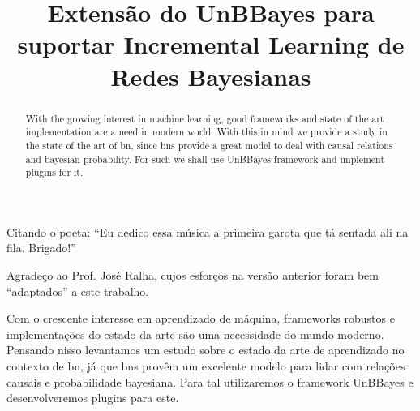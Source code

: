 \documentclass[mpca]{unb-cic}
\title{Extensão do UnBBayes para suportar Incremental Learning de Redes Bayesianas}%
\begin{document}
  \maketitle

  \begin{dedicatoria}
Citando o poeta: ``Eu dedico essa música a primeira garota que tá sentada ali na fila. Brigado!''
  \end{dedicatoria}

  \begin{agradecimentos}
Agradeço ao Prof. José Ralha, cujos esforços na versão anterior foram bem ``adaptados'' a este trabalho.
  \end{agradecimentos}


  \begin{resumo}
	Com o crescente interesse em aprendizado de máquina, frameworks robustos e implementações do estado da arte são uma necessidade do mundo moderno. Pensando nisso levantamos um estudo sobre o estado da arte de aprendizado no contexto de \gls{bn}, já que \glspl{bn} provêm um excelente modelo para lidar com relações causais e probabilidade bayesiana. Para tal utilizaremos o framework UnBBayes e desenvolveremos plugins para este.
  \end{resumo}
  

  \begin{abstract}
  With the growing interest in machine learning, good frameworks and state of the art implementation are a need in modern world. With this in mind we provide a study in the state of the art of \gls{bn}, since \glspl{bn} provide a great model to deal with causal relations and bayesian probability. For such we shall use UnBBayes framework and implement plugins for it.
  \end{abstract}

  \tableofcontents
  \listoffigures
  \listoftables
  \printnoidxglossaries
\renewcommand{\appendixname}{Anexo}


  \textual
  
  
  
  
  
  

  \postextual
  
  

\appendix
\end{document}
